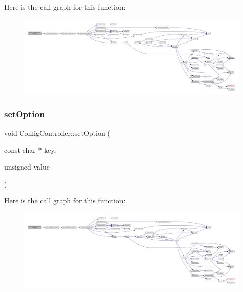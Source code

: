 Here is the call graph for this function\+:
\nopagebreak
\begin{figure}[H]
\begin{center}
\leavevmode
\includegraphics[width=350pt]{class_q_g_b_a_1_1_config_controller_a63c940b97dda27d822b7255f88e0691c_cgraph}
\end{center}
\end{figure}
\mbox{\label{class_q_g_b_a_1_1_config_controller_aece01bed508411acb7fd4ce0012e7589}} 
\subsubsection{\texorpdfstring{set\+Option}{setOption}\hspace{0.1cm}{\footnotesize\ttfamily [3/5]}}
{\footnotesize\ttfamily void Config\+Controller\+::set\+Option (\begin{DoxyParamCaption}\item[{const char $\ast$}]{key,  }\item[{unsigned}]{value }\end{DoxyParamCaption})\hspace{0.3cm}{\ttfamily [slot]}}

Here is the call graph for this function\+:
\nopagebreak
\begin{figure}[H]
\begin{center}
\leavevmode
\includegraphics[width=350pt]{class_q_g_b_a_1_1_config_controller_aece01bed508411acb7fd4ce0012e7589_cgraph}
\end{center}
\end{figure}
\mbox{\label{class_q_g_b_a_1_1_config_controller_abbb3d3f7816f281b88629a65dd9eb096}} 
